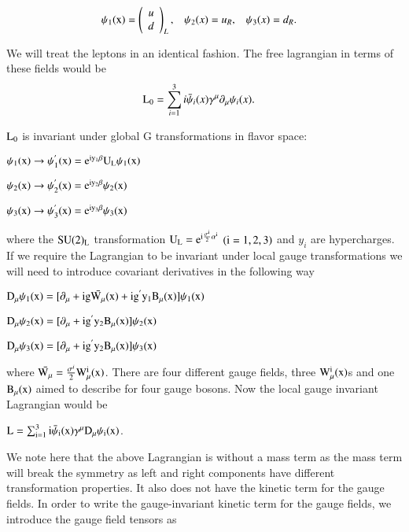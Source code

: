 \begin{align} \label{LRstates}
\rm \psi_{1}(x) &= \left( \begin{array}{cc} u  \\ d  \end{array} \right)_{L},  & \psi_{2}(x) &= u_{R},   & \psi_{3}(x) &= d_{R}.
\end{align}

We will treat the leptons in an identical fashion. The free lagrangian in terms of these fields would be 
\begin{align} \label{L0}
\rm L_{0} &= \sum_{i=1}^{3} i\bar{\psi}_{i}(x)\gamma^{\mu}\partial_{\mu}\psi_{i}(x).
\end{align}



 $\rm L_{0}$ is invariant under global G transformations in flavor space:

$\rm \psi_{1}(x) \rightarrow \psi_{1}^{'}(x) = e^{iy_{1}\beta} U_{L} \psi_{1}(x)$ 

$\rm \psi_{2}(x) \rightarrow \psi_{2}^{'}(x) = e^{iy_{2}\beta} \psi_{2}(x)$

$\rm \psi_{3}(x) \rightarrow \psi_{3}^{'}(x) = e^{iy_{3}\beta}  \psi_{3}(x)$

where the $\rm SU(2)_{L}$ transformation $\rm U_{L} = e^{i\frac{\sigma^{i}}{2}\alpha^{i}}$ $\rm (i = 1, 2, 3)$ and $y_{i}$ are hypercharges. If we require the Lagrangian to be invariant under local gauge transformations we will need to introduce covariant derivatives in the following way

$\rm D_{\mu} \psi_{1}(x) = [\partial_{\mu} + ig\bar{W_{\mu}}(x) + ig^{'}y_{1}B_{\mu}(x)] \psi_{1}(x)$

$\rm D_{\mu} \psi_{2}(x) = [\partial_{\mu} + ig^{'}y_{2}B_{\mu}(x)] \psi_{2}(x)$

$\rm D_{\mu} \psi_{3}(x) = [\partial_{\mu} +  ig^{'}y_{2}B_{\mu}(x)] \psi_{3}(x)$

where $\bar{\rm W_{\mu}} = \frac{\sigma^{i}}{2} \rm W^{i}_{\mu}(x)$. There are four different gauge fields, three $\rm W^{i}_{\mu}(x)$s and one $\rm B_{\mu}(x)$ aimed to describe for four gauge bosons. Now the local gauge invariant Lagrangian would be

$\rm L= \sum_{i=1}^{3} i\bar{\psi}_{i}(x)\gamma^{\mu} D_{\mu} \psi_{i}(x)$. 

We note here that the above Lagrangian is without a mass term as the mass term will break the symmetry as left and right components  have different transformation properties. It also does not have the kinetic term for the gauge fields. In order to write the gauge-invariant kinetic term for the gauge fields, we introduce the gauge field tensors as 

